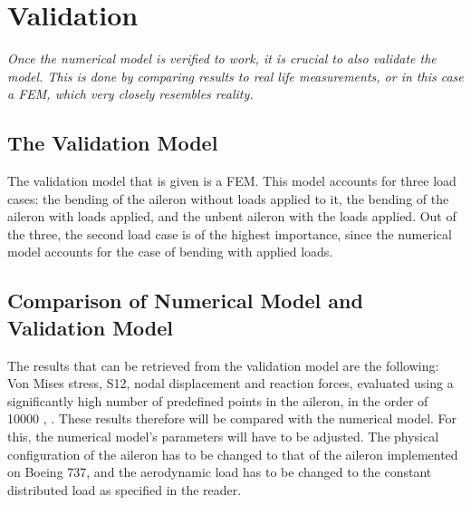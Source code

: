\section{Validation}
\label{sec:Validation}
\textit{Once the numerical model is verified to work, it is crucial to also validate the model. This is done by comparing results to real life measurements, or in this case a FEM, which very closely resembles reality.}

\subsection{The Validation Model} 
The validation model that is given is a FEM. This model accounts for three load cases: the bending of the aileron without loads applied to it, the bending of the aileron with loads applied, and the unbent aileron with the loads applied. Out of the three, the second load case is of the highest importance, since the numerical model accounts for the case of bending with applied loads.

\subsection{Comparison of Numerical Model and Validation Model}
The results that can be retrieved from the validation model are the following: Von Mises stress, S12, nodal displacement and reaction forces, evaluated using a significantly high number of predefined points in the aileron, in the order of 10000 \cite{Assignment_description}, \cite{SVV_Validation_Data_2020}. These results therefore will be compared with the numerical model. For this, the numerical model's parameters will have to be adjusted. The physical configuration of the aileron has to be changed to that of the aileron implemented on Boeing 737, and the aerodynamic load has to be changed to the constant distributed load as specified in the reader.\\

